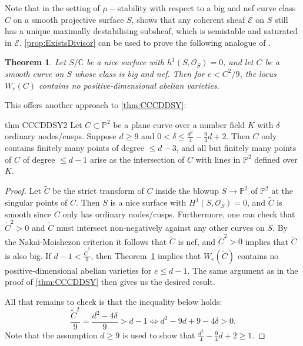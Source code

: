 \documentclass[fontsize=11pt,reqno]{amsart}
\newtheorem{thm}{Theorem}[section]
\theoremstyle{definition}
\theoremstyle{remark}
\newcommand{\C}{\mathbb{C}}
\newcommand{\tC}{\widetilde{C}}
\renewcommand{\P}{\mathbb{P}}
\renewcommand{\O}{\mathcal{O}}
\begin{document}
Note that in the setting of $\mu-$stability with respect to a big and nef curve class $C$ on a smooth projective surface $S$, \cite[Corollary 2.25]{GKP16} shows that any coherent sheaf $\mathcal{E}$ on $S$ still has a unique maximally destabilising subsheaf, which is semistable and saturated in $\mathcal{E}$. \cref{prop:ExistsDivisor} can be used to prove the following analogue of \cite[Theorem 2.9]{SmithVogt22}.

\begin{thm}\label{thm: main_geometric}
Let $S/\C$ be a nice surface with $h^1(S, \O_S)=0$, and let $C$ be a smooth curve on $S$ whose class is big and nef. Then for $e < C^2/9$, the locus $W_e(C)$ contains no positive-dimensional abelian varieties.
\end{thm}

This offers another approach to \cref{thm:CCCDDSY}:

\begin{restatable}{thm} {CCCDDSY2}\label{thm:CCCDDSY2} Let $C \subset \P^{2}$ be a plane curve over a number field $K$ with $\delta$ ordinary nodes/cusps. Suppose $d \geq 9$ and $0<\delta \leq \frac{d^2}{4}-\frac{9}{4}d+2$.
Then $C$ only contains finitely many points of degree $\leq d-3$, and all but finitely many points of $C$ of degree $\leq d-1$ arise as the intersection of $C$ with lines in $\P^2$ defined over $K$.
\end{restatable}
\begin{proof}
    Let $\tC$ be the strict transform of $C$ inside the blowup $S \rightarrow \mathbb{P}^2$ of $\P^{2}$ at the singular points of $C$. Then $S$ is a nice surface with $H^1(S,\mathcal{O}_S)=0$, and $\tC$ is smooth since $C$ only has ordinary nodes/cusps. Furthermore, one can check that $\tC^{2} > 0$ and $\tC$ must intersect non-negatively against any other curves on $S$. By the Nakai-Moishezon criterion it follows that $\tC$ is nef, and $\tC^{2} > 0$ implies that $\tC$ is also big. If $d-1 < \frac{\tC^2}{9}$, then Theorem~\ref{thm: main_geometric} implies that $W_e(\tC)$ contains no positive-dimensional abelian varieties for $e \leq d-1$. The same argument as in the proof of \cref{thm:CCCDDSY} %
    then gives us the desired result.
    
    All that remains to check is that the inequality below holds:
    \begin{equation*}
        \frac{\tC^2}{9} = \frac{d^2-4\delta}{9} > d-1 \iff d^2-9d+9-4\delta >0.
    \end{equation*}
    Note that the assumption $d \geq 9$ is used to show that $\frac{d^2}{4}-\frac{9}{4}d+2 \geq 1$.
\end{proof}
\end{document}
